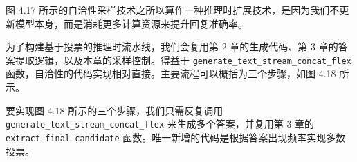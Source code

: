 
图 4.17 所示的自洽性采样技术之所以算作一种推理时扩展技术，是因为我们不更新模型本身，而是消耗更多计算资源来提升回复准确率。

为了构建基于投票的推理时流水线，我们会复用第 2 章的生成代码、第 3 章的答案提取逻辑，以及本章的采样控制。得益于 \texttt{generate\_text\_stream\_concat\_flex} 函数，自洽性的代码实现相对直接。主要流程可以概括为三个步骤，如图 4.18 所示。


要实现图 4.18 所示的三个步骤，我们只需反复调用 \texttt{generate\_text\_stream\_concat\_flex} 来生成多个答案，并复用第 3 章的 \texttt{extract\_final\_candidate} 函数。唯一新增的代码是根据答案出现频率实现多数投票。

